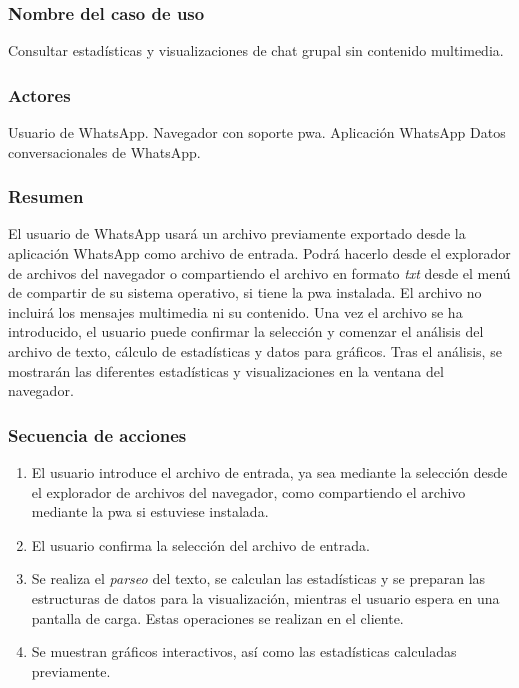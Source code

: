\subsubsection{Nombre del caso de uso} Consultar estadísticas y visualizaciones de chat grupal sin contenido multimedia.

\subsubsection{Actores}

Usuario de WhatsApp.
Navegador con soporte \acrfull{pwa}.
Aplicación WhatsApp
Datos conversacionales de WhatsApp.

\subsubsection{Resumen} El usuario de WhatsApp usará un archivo previamente exportado desde la aplicación WhatsApp como archivo de entrada. Podrá hacerlo desde el explorador de archivos del navegador o compartiendo el archivo en formato \textit{txt} desde el menú de compartir de su sistema operativo, si tiene la \acrfull{pwa} instalada. El archivo no incluirá los mensajes multimedia ni su contenido. Una vez el archivo se ha introducido, el usuario puede confirmar la selección y comenzar el análisis del archivo de texto, cálculo de estadísticas y datos para gráficos. Tras el análisis, se mostrarán las diferentes estadísticas y visualizaciones en la ventana del navegador.

\subsubsection{Secuencia de acciones}

\begin{enumerate}
	\item El usuario introduce el archivo de entrada, ya sea mediante la selección desde el explorador de archivos del navegador, como compartiendo el archivo mediante la \acrshort{pwa} si estuviese instalada.
	\item El usuario confirma la selección del archivo de entrada.
	\item Se realiza el \textit{parseo} del texto, se calculan las estadísticas y se preparan las estructuras de datos para la visualización, mientras el usuario espera en una pantalla de carga. Estas operaciones se realizan en el cliente.
	\item Se muestran gráficos interactivos, así como las estadísticas calculadas previamente.
\end{enumerate}

